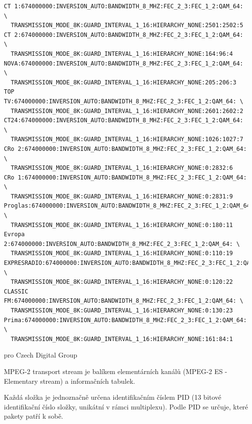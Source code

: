 \begin{small}
\begin{verbatim}
CT 1:674000000:INVERSION_AUTO:BANDWIDTH_8_MHZ:FEC_2_3:FEC_1_2:QAM_64: \
  TRANSMISSION_MODE_8K:GUARD_INTERVAL_1_16:HIERARCHY_NONE:2501:2502:5
CT 2:674000000:INVERSION_AUTO:BANDWIDTH_8_MHZ:FEC_2_3:FEC_1_2:QAM_64: \
  TRANSMISSION_MODE_8K:GUARD_INTERVAL_1_16:HIERARCHY_NONE:164:96:4
NOVA:674000000:INVERSION_AUTO:BANDWIDTH_8_MHZ:FEC_2_3:FEC_1_2:QAM_64: \
  TRANSMISSION_MODE_8K:GUARD_INTERVAL_1_16:HIERARCHY_NONE:205:206:3
TOP TV:674000000:INVERSION_AUTO:BANDWIDTH_8_MHZ:FEC_2_3:FEC_1_2:QAM_64: \
  TRANSMISSION_MODE_8K:GUARD_INTERVAL_1_16:HIERARCHY_NONE:2601:2602:2
CT24:674000000:INVERSION_AUTO:BANDWIDTH_8_MHZ:FEC_2_3:FEC_1_2:QAM_64: \
  TRANSMISSION_MODE_8K:GUARD_INTERVAL_1_16:HIERARCHY_NONE:1026:1027:7
CRo 2:674000000:INVERSION_AUTO:BANDWIDTH_8_MHZ:FEC_2_3:FEC_1_2:QAM_64: \
  TRANSMISSION_MODE_8K:GUARD_INTERVAL_1_16:HIERARCHY_NONE:0:2832:6
CRo 1:674000000:INVERSION_AUTO:BANDWIDTH_8_MHZ:FEC_2_3:FEC_1_2:QAM_64: \
  TRANSMISSION_MODE_8K:GUARD_INTERVAL_1_16:HIERARCHY_NONE:0:2831:9
Proglas:674000000:INVERSION_AUTO:BANDWIDTH_8_MHZ:FEC_2_3:FEC_1_2:QAM_64: \
  TRANSMISSION_MODE_8K:GUARD_INTERVAL_1_16:HIERARCHY_NONE:0:180:11
Evropa 2:674000000:INVERSION_AUTO:BANDWIDTH_8_MHZ:FEC_2_3:FEC_1_2:QAM_64: \
  TRANSMISSION_MODE_8K:GUARD_INTERVAL_1_16:HIERARCHY_NONE:0:110:19
EXPRESRADIO:674000000:INVERSION_AUTO:BANDWIDTH_8_MHZ:FEC_2_3:FEC_1_2:QAM_64: \
  TRANSMISSION_MODE_8K:GUARD_INTERVAL_1_16:HIERARCHY_NONE:0:120:22
CLASSIC FM:674000000:INVERSION_AUTO:BANDWIDTH_8_MHZ:FEC_2_3:FEC_1_2:QAM_64: \
  TRANSMISSION_MODE_8K:GUARD_INTERVAL_1_16:HIERARCHY_NONE:0:130:23
Prima:674000000:INVERSION_AUTO:BANDWIDTH_8_MHZ:FEC_2_3:FEC_1_2:QAM_64: \
  TRANSMISSION_MODE_8K:GUARD_INTERVAL_1_16:HIERARCHY_NONE:161:84:1
\end{verbatim}
\end{small}

\vspace{10pt}

pro Czech Digital Group 

\vspace{10pt}

MPEG-2 transport stream je balíkem elementárních kanálů (MPEG-2 ES - Elementary stream) a informačních tabulek.

Každá složka je jednoznačně určena identifikačním číslem PID (13 bitové identifikační číslo složky, unikátní v rámci multiplexu). Podle PID se určuje, které pakety patří k sobě.

\vspace{10pt}


